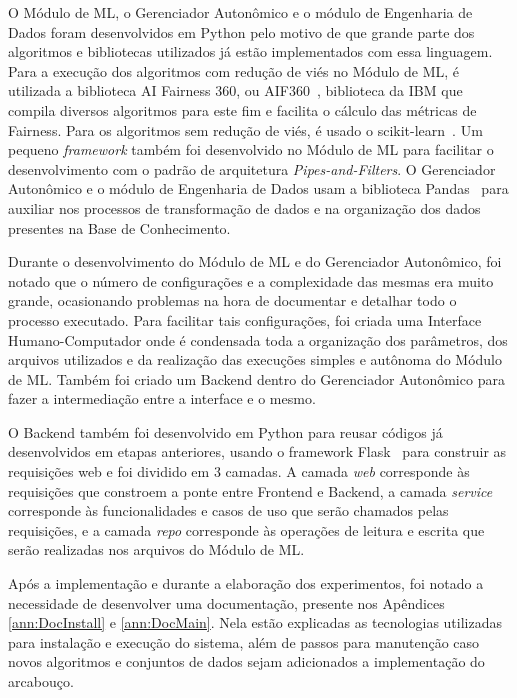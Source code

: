 \documentclass[Portugues,Final]{ic-tese-v3}
\begin{document}
O Módulo de ML, o Gerenciador Autonômico e o módulo de Engenharia de Dados foram desenvolvidos em Python pelo motivo de que grande parte dos algoritmos e bibliotecas utilizados já estão implementados com essa linguagem. Para a execução dos algoritmos com redução de viés no Módulo de ML, é utilizada a biblioteca AI Fairness 360, ou AIF360~\cite{AIF360_2022}, biblioteca da IBM que compila diversos algoritmos para este fim e facilita o cálculo das métricas de Fairness. Para os algoritmos sem redução de viés, é usado o scikit-learn~\cite{scikit_2022}. Um pequeno \textit{framework} também foi desenvolvido no Módulo de ML para facilitar o desenvolvimento com o padrão de arquitetura \textit{Pipes-and-Filters}. O Gerenciador Autonômico e o módulo de Engenharia de Dados usam a biblioteca Pandas~\cite{Pandas_2023} para auxiliar nos processos de transformação de dados e na organização dos dados presentes na Base de Conhecimento.

Durante o desenvolvimento do Módulo de ML e do Gerenciador Autonômico, foi notado que o número de configurações e a complexidade das mesmas era muito grande, ocasionando problemas na hora de documentar e detalhar todo o processo executado. Para facilitar tais configurações, foi criada uma Interface Humano-Computador onde é condensada toda a organização dos parâmetros, dos arquivos utilizados e da realização das execuções simples e autônoma do Módulo de ML. Também foi criado um Backend dentro do Gerenciador Autonômico para fazer a intermediação entre a interface e o mesmo.

O Backend também foi desenvolvido em Python para reusar códigos já desenvolvidos em etapas anteriores, usando o framework Flask~\cite{Flask_2023} para construir as requisições web e foi dividido em 3 camadas. A camada \textit{web} corresponde às requisições que constroem a ponte entre Frontend e Backend, a camada \textit{service} corresponde às funcionalidades e casos de uso que serão chamados pelas requisições, e a camada \textit{repo} corresponde às operações de leitura e escrita que serão realizadas nos arquivos do Módulo de ML.

Após a implementação e durante a elaboração dos experimentos, foi notado a necessidade de desenvolver uma documentação, presente nos Apêndices \ref{ann:DocInstall} e \ref{ann:DocMain}. Nela estão explicadas as tecnologias utilizadas para instalação e execução do sistema, além de passos para manutenção caso novos algoritmos e conjuntos de dados sejam adicionados a implementação do arcabouço.
\end{document}

